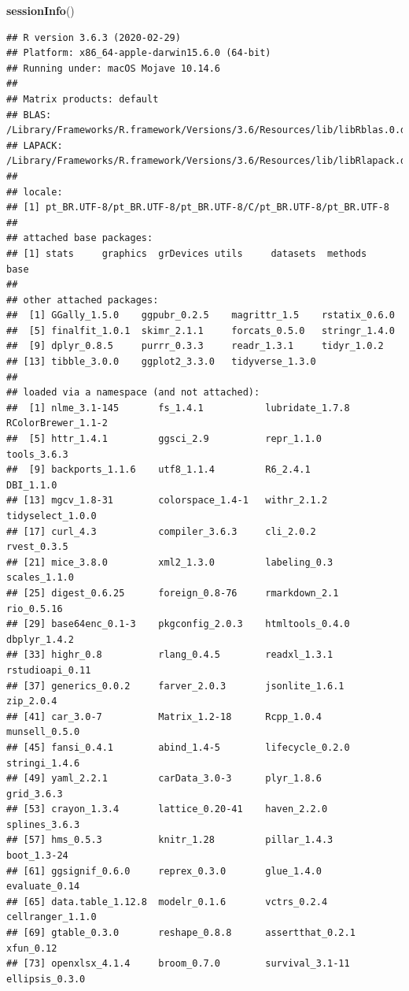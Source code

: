 \documentclass[]{article}
\newenvironment{Shaded}{\begin{snugshade}}{\end{snugshade}}
\newcommand{\KeywordTok}[1]{\textcolor[rgb]{0.13,0.29,0.53}{\textbf{#1}}}
\newcommand{\NormalTok}[1]{#1}
\begin{document}
\begin{Shaded}
\begin{Highlighting}[]
\KeywordTok{sessionInfo}\NormalTok{()}
\end{Highlighting}
\end{Shaded}

\begin{verbatim}
## R version 3.6.3 (2020-02-29)
## Platform: x86_64-apple-darwin15.6.0 (64-bit)
## Running under: macOS Mojave 10.14.6
## 
## Matrix products: default
## BLAS:   /Library/Frameworks/R.framework/Versions/3.6/Resources/lib/libRblas.0.dylib
## LAPACK: /Library/Frameworks/R.framework/Versions/3.6/Resources/lib/libRlapack.dylib
## 
## locale:
## [1] pt_BR.UTF-8/pt_BR.UTF-8/pt_BR.UTF-8/C/pt_BR.UTF-8/pt_BR.UTF-8
## 
## attached base packages:
## [1] stats     graphics  grDevices utils     datasets  methods   base     
## 
## other attached packages:
##  [1] GGally_1.5.0    ggpubr_0.2.5    magrittr_1.5    rstatix_0.6.0  
##  [5] finalfit_1.0.1  skimr_2.1.1     forcats_0.5.0   stringr_1.4.0  
##  [9] dplyr_0.8.5     purrr_0.3.3     readr_1.3.1     tidyr_1.0.2    
## [13] tibble_3.0.0    ggplot2_3.3.0   tidyverse_1.3.0
## 
## loaded via a namespace (and not attached):
##  [1] nlme_3.1-145       fs_1.4.1           lubridate_1.7.8    RColorBrewer_1.1-2
##  [5] httr_1.4.1         ggsci_2.9          repr_1.1.0         tools_3.6.3       
##  [9] backports_1.1.6    utf8_1.1.4         R6_2.4.1           DBI_1.1.0         
## [13] mgcv_1.8-31        colorspace_1.4-1   withr_2.1.2        tidyselect_1.0.0  
## [17] curl_4.3           compiler_3.6.3     cli_2.0.2          rvest_0.3.5       
## [21] mice_3.8.0         xml2_1.3.0         labeling_0.3       scales_1.1.0      
## [25] digest_0.6.25      foreign_0.8-76     rmarkdown_2.1      rio_0.5.16        
## [29] base64enc_0.1-3    pkgconfig_2.0.3    htmltools_0.4.0    dbplyr_1.4.2      
## [33] highr_0.8          rlang_0.4.5        readxl_1.3.1       rstudioapi_0.11   
## [37] generics_0.0.2     farver_2.0.3       jsonlite_1.6.1     zip_2.0.4         
## [41] car_3.0-7          Matrix_1.2-18      Rcpp_1.0.4         munsell_0.5.0     
## [45] fansi_0.4.1        abind_1.4-5        lifecycle_0.2.0    stringi_1.4.6     
## [49] yaml_2.2.1         carData_3.0-3      plyr_1.8.6         grid_3.6.3        
## [53] crayon_1.3.4       lattice_0.20-41    haven_2.2.0        splines_3.6.3     
## [57] hms_0.5.3          knitr_1.28         pillar_1.4.3       boot_1.3-24       
## [61] ggsignif_0.6.0     reprex_0.3.0       glue_1.4.0         evaluate_0.14     
## [65] data.table_1.12.8  modelr_0.1.6       vctrs_0.2.4        cellranger_1.1.0  
## [69] gtable_0.3.0       reshape_0.8.8      assertthat_0.2.1   xfun_0.12         
## [73] openxlsx_4.1.4     broom_0.7.0        survival_3.1-11    ellipsis_0.3.0
\end{verbatim}
\end{document}
